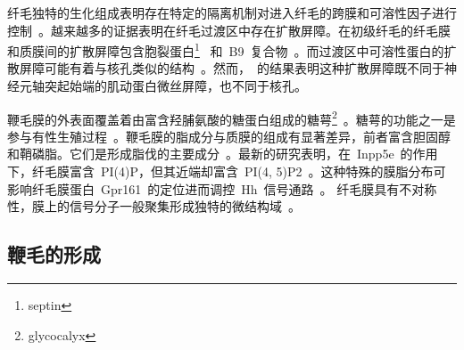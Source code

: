 纤毛独特的生化组成表明存在特定的隔离机制对进入纤毛的跨膜和可溶性因子进行控制\ \citep{Ye2013}。越来越多的证据表明在纤毛过渡区中存在扩散屏障。在初级纤毛的纤毛膜和质膜间的扩散屏障包含胞裂蛋白\footnote{septin}\ \citep{Hu2010} 和\ B9\ 复合物\ \citep{Chih2011}。而过渡区中可溶性蛋白的扩散屏障可能有着与核孔类似的结构\
\citep{Kee2012,Huang2010}。然而，\citet{Breslow2013}\ 的结果表明这种扩散屏障既不同于神经元轴突起始端的肌动蛋白微丝屏障，也不同于核孔。

鞭毛膜的外表面覆盖着由富含羟脯氨酸的糖蛋白组成的糖萼\footnote{glycocalyx}\ \citep{Pigino2009}。糖萼的功能之一是参与有性生殖过程\ \citep{Cooper1983}。鞭毛膜的脂成分与质膜的组成有显著差异，前者富含胆固醇和鞘磷脂。它们是形成脂伐的主要成分\ \citep{Garcia-Gonzalo2015,Chavez2015}。最新的研究表明，在\ Inpp5e\
的作用下，纤毛膜富含\ PI(4)P，但其近端却富含\ PI(4, 5)P2\ \citep{Garcia-Gonzalo2015}。这种特殊的膜脂分布可影响纤毛膜蛋白\ Gpr161\
的定位进而调控\ Hh\ 信号通路\ \citep{Garcia-Gonzalo2015,Chavez2015}。 纤毛膜具有不对称性，膜上的信号分子一般聚集形成独特的微结构域\ \citep{Nechipurenko2013}。

\subsection{鞭毛的形成}

